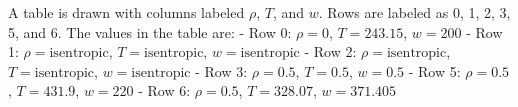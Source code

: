 A table is drawn with columns labeled \( \rho \), \( T \), and \( w \). Rows are labeled as 0, 1, 2, 3, 5, and 6. The values in the table are:  
- Row 0: \( \rho = 0 \), \( T = 243.15 \), \( w = 200 \)  
- Row 1: \( \rho = \text{isentropic} \), \( T = \text{isentropic} \), \( w = \text{isentropic} \)  
- Row 2: \( \rho = \text{isentropic} \), \( T = \text{isentropic} \), \( w = \text{isentropic} \)  
- Row 3: \( \rho = 0.5 \), \( T = 0.5 \), \( w = 0.5 \)  
- Row 5: \( \rho = 0.5 \), \( T = 431.9 \), \( w = 220 \)  
- Row 6: \( \rho = 0.5 \), \( T = 328.07 \), \( w = 371.405 \)